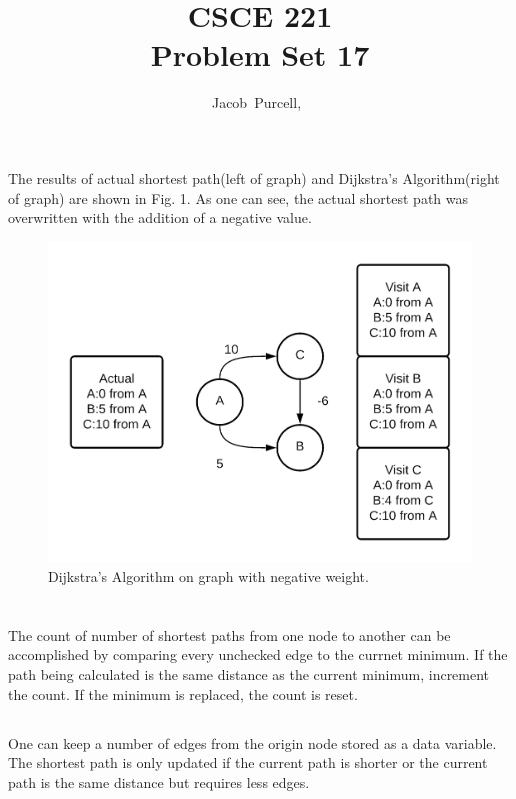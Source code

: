\documentclass[journal]{IEEEtran}
\begin{document}
\title{CSCE 221 \\ Problem Set 17}

\author{Jacob~Purcell,~}

\maketitle
\section{}

The results of actual shortest path(left of graph) and Dijkstra's Algorithm(right of graph) are shown in Fig. 1. 
As one can see, the actual shortest path was overwritten with the addition of a negative value.

\begin{figure}[h!]
    \includegraphics[scale = 0.17]{dnw.png}
    \caption{Dijkstra's Algorithm on graph with negative weight.}
\end{figure}

\section{}
\subsection{}
The count of number of shortest paths from one node to another can be accomplished by comparing every unchecked edge to the currnet minimum.
If the path being calculated is the same distance as the current minimum, increment the count. If the minimum is replaced, the count is reset.

\subsection{}
One can keep a number of edges from the origin node stored as a data variable. The shortest path is only updated if the current path is shorter or
the current path is the same distance but requires less edges.
\end{document}
